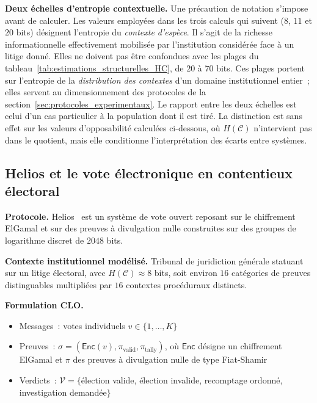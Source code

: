 \begin{sloppypar}
\noindent\textbf{Deux \'echelles d'entropie contextuelle.} Une pr\'ecaution de
notation s'impose avant de calculer. Les valeurs employ\'ees dans les trois
calculs qui suivent ($8$, $11$ et $20$ bits) d\'esignent l'entropie
du \emph{contexte d'esp\`ece}. Il s'agit de la richesse informationnelle effectivement
mobilis\'ee par l'institution consid\'er\'ee face \`a un litige donn\'e. Elles ne
doivent pas \^etre confondues avec les plages du
tableau~\ref{tab:estimations_structurelles_HC}, de $20$ \`a $70$ bits. Ces plages
portent sur l'entropie de la \emph{distribution des contextes} d'un domaine
institutionnel entier~; elles servent au dimensionnement des protocoles de la
section~\ref{sec:protocoles_experimentaux}. Le rapport entre les deux
\'echelles est celui d'un cas particulier \`a la population dont il est tir\'e.
La distinction est sans effet sur les valeurs d'opposabilit\'e calcul\'ees
ci-dessous, o\`u $H(\mathcal{C})$ n'intervient pas dans le quotient, mais elle
conditionne l'interpr\'etation des \'ecarts entre syst\`emes.

\subsection{Helios et le vote \'electronique en contentieux \'electoral}
\label{sec:derivation_helios}

\noindent\textbf{Protocole.} Helios~\cite{Adida08} est un syst\`eme de vote
ouvert reposant sur le chiffrement ElGamal et sur des preuves
\`a divulgation nulle construites sur des groupes de logarithme discret de
$2048$ bits.

\noindent\textbf{Contexte institutionnel mod\'elis\'e.} Tribunal de juridiction
g\'en\'erale statuant sur un litige \'electoral, avec
$H(\mathcal{C}) \approx 8$ bits, soit environ $16$ cat\'egories de preuves
distinguables multipli\'ees par $16$ contextes proc\'eduraux distincts.

\noindent\textbf{Formulation CLO.}
\begin{itemize}
\item Messages~: votes individuels $v \in \{1,\ldots,K\}$
\item Preuves~: $\sigma = (\mathsf{Enc}(v), \pi_{\text{valid}}, \pi_{\text{tally}})$,
      o\`u $\mathsf{Enc}$ d\'esigne un chiffrement ElGamal et $\pi$ des preuves
      \`a divulgation nulle de type Fiat-Shamir
\item Verdicts~: $\mathcal{V} = \{$\'election valide, \'election invalide,
      recomptage ordonn\'e, investigation demand\'ee$\}$
\end{itemize}


\end{sloppypar}
